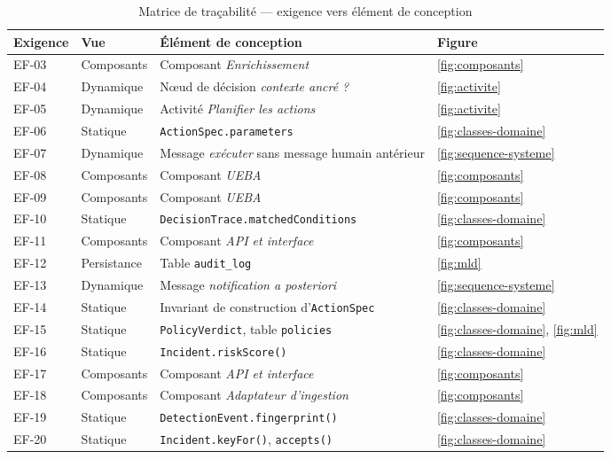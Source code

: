 \begin{table}[H]
\centering
\caption{Matrice de tra\c cabilit\'e --- exigence vers \'el\'ement de conception}
\label{tab:tracabilite}
\scriptsize
\begin{tabular}{@{}llp{5.4cm}l@{}}
\toprule
\textbf{Exigence} & \textbf{Vue} & \textbf{\'El\'ement de conception} & \textbf{Figure} \\
\midrule
EF-03 & Composants & Composant \emph{Enrichissement} & \ref{fig:composants} \\
EF-04 & Dynamique  & N\oe ud de d\'ecision \emph{contexte ancr\'e ?} & \ref{fig:activite} \\
EF-05 & Dynamique  & Activit\'e \emph{Planifier les actions} & \ref{fig:activite} \\
EF-06 & Statique   & \texttt{ActionSpec.parameters} & \ref{fig:classes-domaine} \\
EF-07 & Dynamique  & Message \emph{ex\'ecuter} sans message humain ant\'erieur & \ref{fig:sequence-systeme} \\
EF-08 & Composants & Composant \emph{UEBA} & \ref{fig:composants} \\
EF-09 & Composants & Composant \emph{UEBA} & \ref{fig:composants} \\
EF-10 & Statique   & \texttt{DecisionTrace.matchedConditions} & \ref{fig:classes-domaine} \\
EF-11 & Composants & Composant \emph{API et interface} & \ref{fig:composants} \\
EF-12 & Persistance& Table \texttt{audit\_log} & \ref{fig:mld} \\
EF-13 & Dynamique  & Message \emph{notification a posteriori} & \ref{fig:sequence-systeme} \\
EF-14 & Statique   & Invariant de construction d'\texttt{ActionSpec} & \ref{fig:classes-domaine} \\
EF-15 & Statique   & \texttt{PolicyVerdict}, table \texttt{policies} & \ref{fig:classes-domaine}, \ref{fig:mld} \\
EF-16 & Statique   & \texttt{Incident.riskScore()} & \ref{fig:classes-domaine} \\
EF-17 & Composants & Composant \emph{API et interface} & \ref{fig:composants} \\
EF-18 & Composants & Composant \emph{Adaptateur d'ingestion} & \ref{fig:composants} \\
EF-19 & Statique   & \texttt{DetectionEvent.fingerprint()} & \ref{fig:classes-domaine} \\
EF-20 & Statique   & \texttt{Incident.keyFor()}, \texttt{accepts()} & \ref{fig:classes-domaine} \\

\end{tabular}
\end{table}
